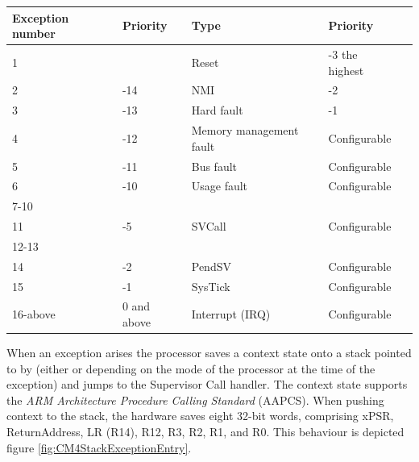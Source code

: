 \begin{longtable}[c]{llllp{5cm}}
\toprule
{\bf Exception number} & {\bf Priority} & {\bf Type} & {\bf Priority} \\
\midrule
1 & & Reset & -3 the highest \\
\hline
2 & -14 & NMI & -2 \\
\hline
3 & -13 & Hard fault & -1 \\
\hline
4 & -12 & Memory management fault & Configurable \\
\hline
5 & -11 & Bus fault & Configurable \\
\hline
6 & -10 & Usage fault & Configurable \\
\hline
7-10 & & & \\
\hline
11 & -5 & SVCall & Configurable \\
\hline
12-13 & & & \\
\hline
14 & -2 & PendSV & Configurable \\
\hline
15 & -1 & SysTick & Configurable \\
\hline
16-above & 0 and above & Interrupt (IRQ) & Configurable \\
\bottomrule
\end{longtable}

When an exception arises the processor saves a context state onto a stack pointed to by  (either  or  depending on the mode of the processor at the time of the exception) and jumps to the Supervisor Call handler. The context state supports the \textit{ARM Architecture Procedure Calling Standard} (AAPCS).
When pushing context to the stack, the hardware saves eight 32-bit words, comprising xPSR, ReturnAddress, LR (R14), R12, R3, R2, R1, and R0. This behaviour is depicted figure \ref{fig:CM4StackExceptionEntry}.

